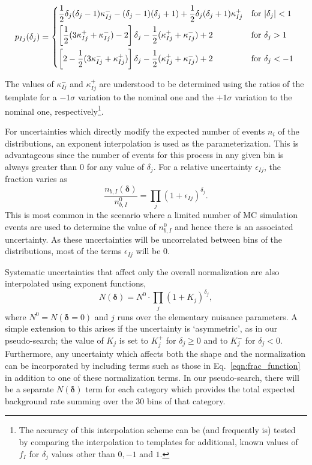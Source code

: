 \documentclass[11pt]{article}
\begin{document}
\begin{equation}
 p_{Ij}(\delta_{j}) = \begin{dcases*}
 		\frac{1}{2} \delta_{j}(\delta_{j}-1) \kappa_{Ij}^{-}  -(\delta_{j}-1)(\delta_{j}+1) + \frac{1}{2}\delta_{j}(\delta_{j}+1)\kappa_{Ij}^{+} & for $|\delta_{j}|<1$ \\
        \left[ \frac{1}{2}(3\kappa_{Ij}^{+} + \kappa_{Ij}^{-})-2\right]\delta_{j} - \frac{1}{2}(\kappa_{Ij}^{+}+\kappa_{Ij}^{-})+2 & for $\delta_{j}>1$ \\
         \left[2-\frac{1}{2}(3\kappa_{Ij}^{-} + \kappa_{Ij}^{+})\right]\delta_{j} - \frac{1}{2}(\kappa_{Ij}^{+}+\kappa_{Ij}^{-})+2 & for $\delta_{j}<-1$ \\
    \end{dcases*}
\end{equation}

The values of $\kappa_{Ij}^{-}$ and $\kappa_{Ij}^{+}$ are understood to be determined using the ratios of the template for a $-1\sigma$ variation to the nominal one and the $+1\sigma$
variation to the nominal one, respectively\footnote{The accuracy of this interpolation scheme can be (and frequently is) tested by comparing the interpolation to templates for additional, known values of $f_{I}$ for $\delta_{j}$ values other than $0,-1$ and $1$.}.

For uncertainties which directly modify the expected number of events $n_{i}$ of the distributions, an exponent interpolation is used as the parameterization.
This is advantageous since the number of events for this process in any given bin is always greater than 0 for any value of $\delta_{j}$. For a relative uncertainty $\epsilon_{Ij}$, the fraction varies as
%
\begin{equation}
 \frac{n_{b,I}(\bm{\delta})}{n_{b,I}^{0}}  =  \prod_{j} (1+\epsilon_{Ij})^{\delta_{j}}.
  \label{eqn:bin_function}
\end{equation}
%
This is most common in the scenario where a limited number of MC simulation events are used to determine the value of $n_{b,I}^{0}$
and hence there is an associated uncertainty. As these uncertainties will be uncorrelated between bins of the distributions, most of the terms $\epsilon_{Ij}$ will be 0.

Systematic uncertainties that affect only the overall normalization are also interpolated using exponent functions,
%
\begin{equation}
 N(\bm{\delta})  =   N^{0} \cdot \prod_{j} (1+K_{j})^{\delta_{j}},
 \label{eqn:norm_function}
\end{equation}
%
where $N^{0} = N(\bm{\delta}=0)$ and $j$ runs over the elementary nuisance parameters.  A simple extension to this arises if the uncertainty is `asymmetric', as in our pseudo-search;
the value of $K_{j}$ is set to $K^{+}_{j}$ for $\delta_{j}\geq0$ and to $K^{-}_{j}$ for $\delta_{j} < 0$. Furthermore, any uncertainty which affects both the
shape and the normalization can be incorporated by including terms such as those in Eq.~\eqref{eqn:frac_function} in addition to one of these normalization terms.
In our pseudo-search, there will be a separate $N(\bm{\delta})$ term for each category which provides the total expected background rate summing over the 30 bins of that category.
\end{document}
